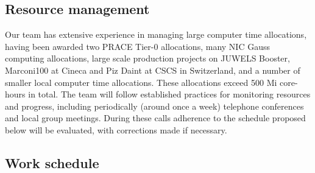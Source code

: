 \subsection{Resource management}

Our team has extensive experience in managing large computer time
allocations, having been awarded two PRACE Tier-0 allocations, many
NIC Gauss computing allocations, large scale production projects on
JUWELS Booster, Marconi100 at Cineca and Piz Daint at CSCS in
Switzerland, and a number of smaller local computer time
allocations. These allocations exceed 500 Mi core-hours in total. The
team will follow established practices for monitoring resources and
progress, including periodically (around once a week) telephone
conferences and local group meetings.  During these calls adherence to
the schedule proposed below will be evaluated, with corrections made
if necessary.

\subsection{Work schedule}

